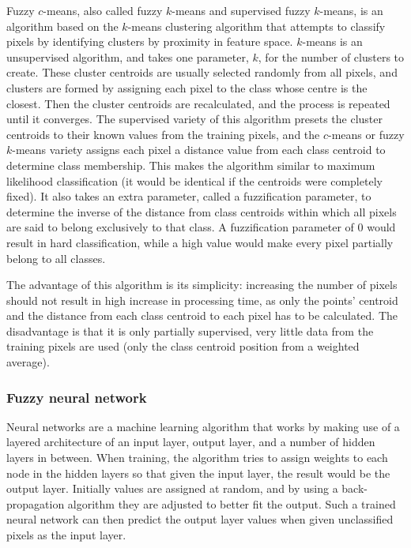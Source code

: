 \documentclass[a4paper,10pt]{article}
\begin{document}
Fuzzy $c$-means, also called fuzzy $k$-means and supervised fuzzy $k$-means, is an algorithm based on the $k$-means clustering algorithm that attempts to classify pixels by identifying clusters by proximity in feature space. $k$-means is an unsupervised algorithm, and takes one parameter, $k$, for the number of clusters to create. These cluster centroids are usually selected randomly from all pixels, and clusters are formed by assigning each pixel to the class whose centre is the closest. Then the cluster centroids are recalculated, and the process is repeated until it converges. The supervised variety of this algorithm presets the cluster centroids to their known values from the training pixels, and the $c$-means or fuzzy $k$-means variety assigns each pixel a distance value from each class centroid to determine class membership. This makes the algorithm similar to maximum likelihood classification (it would be identical if the centroids were completely fixed). It also takes an extra parameter, called a fuzzification parameter, to determine the inverse of the distance from class centroids within which all pixels are said to belong exclusively to that class. A fuzzification parameter of 0 would result in hard classification, while a high value would make every pixel partially belong to all classes. \cite{hengl2004fuzzycmeans}

The advantage of this algorithm is its simplicity: increasing the number of pixels should not result in high increase in processing time, as only the points' centroid and the distance from each class centroid to each pixel has to be calculated. The disadvantage is that it is only partially supervised, very little data from the training pixels are used (only the class centroid position from a weighted average).

\subsubsection{Fuzzy neural network}

Neural networks are a machine learning algorithm that works by making use of a layered architecture of an input layer, output layer, and a number of hidden layers in between. When training, the algorithm tries to assign weights to each node in the hidden layers so that given the input layer, the result would be the output layer. Initially values are assigned at random, and by using a back-propagation algorithm they are adjusted to better fit the output. Such a trained neural network can then predict the output layer values when given unclassified pixels as the input layer. \cite{foody1997fuzzynnet}
\end{document}
